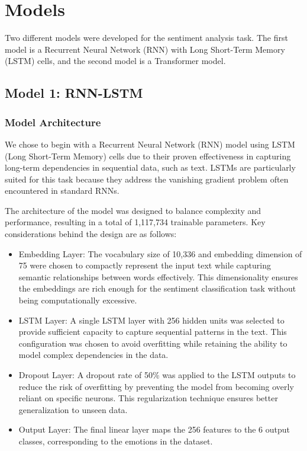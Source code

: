 \section{Models}
Two different models were developed for the sentiment analysis task. The first model is a Recurrent Neural Network (RNN) with Long Short-Term Memory (LSTM) cells, and the second model is a Transformer model.

\subsection{Model 1: RNN-LSTM}
\subsubsection{Model Architecture}
We chose to begin with a Recurrent Neural Network (RNN) model using LSTM (Long Short-Term Memory) cells due to their proven effectiveness in capturing long-term dependencies in sequential data, such as text. LSTMs are particularly suited for this task because they address the vanishing gradient problem often encountered in standard RNNs.

The architecture of the model was designed to balance complexity and performance, resulting in a total of 1,117,734 trainable parameters. Key considerations behind the design are as follows:
\begin{itemize}
    \item Embedding Layer: The vocabulary size of 10,336 and embedding dimension of 75 were chosen to compactly represent the input text while capturing semantic relationships between words effectively. This dimensionality ensures the embeddings are rich enough for the sentiment classification task without being computationally excessive.
    \item LSTM Layer: A single LSTM layer with 256 hidden units was selected to provide sufficient capacity to capture sequential patterns in the text. This configuration was chosen to avoid overfitting while retaining the ability to model complex dependencies in the data.
    \item Dropout Layer: A dropout rate of 50\% was applied to the LSTM outputs to reduce the risk of overfitting by preventing the model from becoming overly reliant on specific neurons. This regularization technique ensures better generalization to unseen data.
    \item Output Layer: The final linear layer maps the 256 features to the 6 output classes, corresponding to the emotions in the dataset.
\end{itemize}

